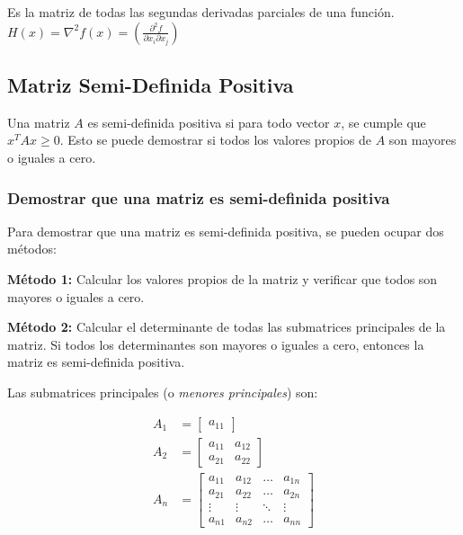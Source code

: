 \documentclass{article}
\begin{document}
Es la matriz de todas las segundas derivadas parciales de una función. $H(x)=\nabla^2f(x) = \left( \frac{\partial^2 f}{\partial x_i \partial x_j} \right)$

\subsection*{Matriz Semi-Definida Positiva}

Una matriz $A$ es semi-definida positiva si para todo vector $x$, se cumple que $x^T A x \geq 0$. Esto se puede demostrar si todos los valores propios de $A$ son mayores o iguales a cero.

\subsubsection*{Demostrar que una matriz es semi-definida positiva}

Para demostrar que una matriz es semi-definida positiva, se pueden ocupar dos métodos:

\textbf{Método 1:} Calcular los valores propios de la matriz y verificar que todos son mayores o iguales a cero.

\vspace{.5cm}

\textbf{Método 2:} Calcular el determinante de todas las submatrices principales de la matriz. Si todos los determinantes son mayores o iguales a cero, entonces la matriz es semi-definida positiva.

Las submatrices principales (o \textit{menores principales}) son:

\begin{align*}
    A_1 & = \begin{bmatrix}
                a_{11}
            \end{bmatrix}                    \\
    A_2 & = \begin{bmatrix}
                a_{11} & a_{12} \\
                a_{21} & a_{22}
            \end{bmatrix}                   \\
    A_n & = \begin{bmatrix}
                a_{11} & a_{12} & \ldots & a_{1n} \\
                a_{21} & a_{22} & \ldots & a_{2n} \\
                \vdots & \vdots & \ddots & \vdots \\
                a_{n1} & a_{n2} & \ldots & a_{nn}
            \end{bmatrix}
\end{align*}
\end{document}
